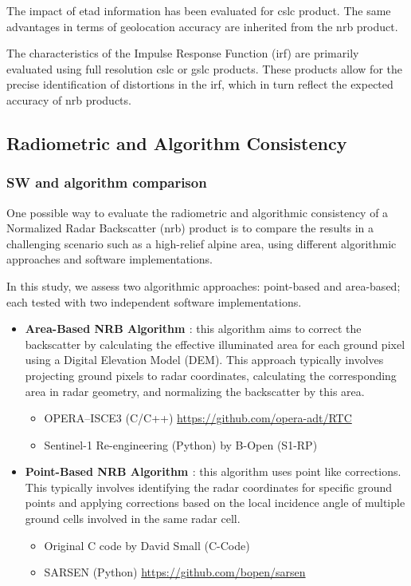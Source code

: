 The impact of \acs{etad} information has been evaluated for \acs{cslc} product. The same advantages in terms of geolocation accuracy are inherited from the \acs{nrb} product.

The characteristics of the Impulse Response Function (\acs{irf}) are primarily evaluated using full resolution \acs{cslc} or \acs{gslc} products. These products allow for the precise identification of distortions in the \acs{irf}, which in turn reflect the expected accuracy of \acs{nrb} products.


\subsection{Radiometric and Algorithm Consistency}
\subsubsection{SW and algorithm comparison}
\label{sec:nrb_implementation_comparison}

One possible way to evaluate the radiometric and algorithmic consistency of a Normalized Radar Backscatter (\acs{nrb}) product is to compare the results in a challenging scenario such as a high-relief alpine area, using different algorithmic approaches and software implementations.

In this study, we assess two algorithmic approaches: point-based and area-based; each tested with two independent software implementations.

\begin{itemize}
  \item \textbf{Area-Based NRB Algorithm \cite{Shiroma2022}}: this algorithm aims to correct the backscatter by calculating the effective illuminated area for each ground pixel using a Digital Elevation Model (DEM). This approach typically involves projecting ground pixels to radar coordinates, calculating the corresponding area in radar geometry, and normalizing the backscatter by this area.
    \begin{itemize}
      \item OPERA–ISCE3 (C/C++) \url{https://github.com/opera-adt/RTC}
      \item Sentinel-1 Re-engineering (Python) by B-Open (S1-RP)
    \end{itemize}
  \item \textbf{Point-Based NRB Algorithm \cite{Small2011}}: this algorithm uses point like corrections. This typically involves identifying the radar coordinates for specific ground points and applying corrections based on the local incidence angle of multiple ground cells involved in the same radar cell.
    \begin{itemize}
      \item Original C code by David Small (C-Code)
      \item SARSEN (Python) \url{https://github.com/bopen/sarsen}
    \end{itemize}
\end{itemize}

